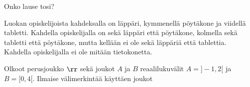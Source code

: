 \begin{tehtava}
Onko lause tosi?
    \begin{alakohdat}
    \end{alakohdat}

    \begin{vastaus}
    
        \begin{alakohdat}
        \end{alakohdat}
    \end{vastaus}
\end{tehtava}


\begin{tehtava}
Luokan opiskelijoista kahdeksalla on läppäri, kymmenellä pöytäkone ja
viidellä tabletti.
Kahdella opiskelijalla on sekä läppäri että pöytäkone, kolmella sekä
tabletti että pöytäkone, mutta kellään ei ole sekä läppäriä että
tablettia. Kahdella opiskelijalla ei ole mitään tietokonetta.
    \begin{alakohdat}
    \end{alakohdat}

    \begin{vastaus}
    
        \begin{alakohdat}
        \alakohta{-} %
        \end{alakohdat}
    \end{vastaus}
\end{tehtava}

\begin{tehtava}
Olkoot perusjoukko $\rr$ sekä joukot $A$ ja $B$ reaalilukuvälit $A=]-1, 2[$ ja $B=[0, 4[$. Ilmaise välimerkintää käyttäen joukot
    \begin{alakohdat}
    \end{alakohdat}

    \begin{vastaus}
    
        \begin{alakohdat}
        \alakohta{}
        \alakohta{}
        \alakohta{}
        \alakohta{}
        \alakohta{}
        \alakohta{} 
        \end{alakohdat}
    \end{vastaus}
\end{tehtava}


